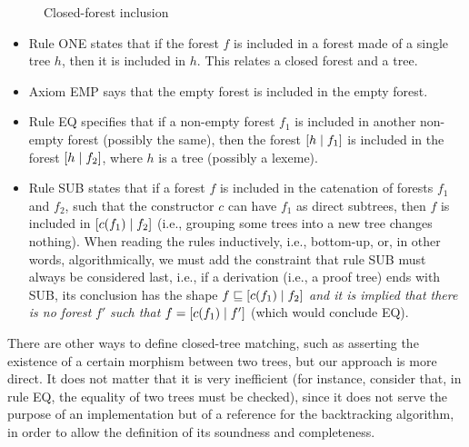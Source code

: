 \begin{figure}[t]
\caption{Closed\hyp{}forest inclusion\label{x_tree_matching_def}}
\end{figure}
\begin{itemize}

  \item Rule \textsf{ONE} states that if the forest \(f\) is included
    in a forest made of a single tree \(h\), then it is included in
    \(h\). This relates a closed forest and a tree.

  \item Axiom \textsf{EMP} says that the empty forest is included in
    the empty forest.

  \item Rule \textsf{EQ} specifies that if a non\hyp{}empty forest
    \(f_1\) is included in another non\hyp{}empty forest (possibly the
    same), then the forest \([{h}\mid{f_1}]\) is included in the forest
    \([{h}\mid{f_2}]\), where \(h\) is a tree (possibly a lexeme).

  \item Rule \textsf{SUB} states that if a forest \(f\) is included in
    the catenation of forests \(f_1\) and \(f_2\), such that the
    constructor \(c\) can have \(f_1\) as direct subtrees, then \(f\)
    is included in \([{c(f_1)}\mid{f_2}]\) (i.e., grouping some trees
    into a new tree changes nothing). When reading the rules
    inductively, i.e., bottom\hyp{}up, or, in other words,
    algorithmically, we must add the constraint that rule \textsf{SUB}
    must always be considered last, i.e., if a derivation (i.e., a
    proof tree) ends with \textsf{SUB}, its conclusion has the shape
    \(f \sqsubseteq [{c(f_1)}\mid{f_2}]\) \emph{and it is implied that
      there is no forest} \(f'\) \emph{such that} \(f =
    [{c(f_1)}\mid{f'}]\) (which would conclude \textsf{EQ}).

\end{itemize}
There are other ways to define closed\hyp{}tree matching, such as
asserting the existence of a certain morphism between two trees, but
our approach is more direct. It does not matter that it is very
inefficient (for instance, consider that, in rule \textsf{EQ}, the
equality of two trees must be checked), since it does not serve the
purpose of an implementation but of a reference for the backtracking
algorithm, in order to allow the definition of its soundness and
completeness.

